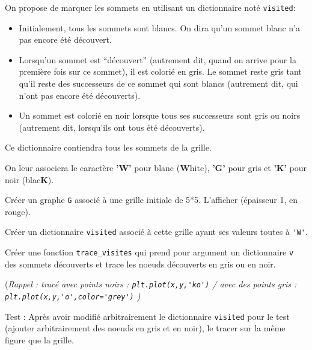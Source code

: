 On propose de marquer les sommets en utilisant un dictionnaire noté \lstinline{visited}:
\begin{itemize}
\item
 Initialement, tous les sommets sont blancs. On dira qu’un sommet blanc n’a pas encore été
découvert.
\item Lorsqu’un sommet est “découvert” (autrement dit, quand on arrive pour la première fois sur
ce sommet), il est colorié en gris. Le sommet reste gris tant qu’il reste des successeurs de ce
sommet qui sont blancs (autrement dit, qui n’ont pas encore été découverts).
\item Un sommet est colorié en noir lorsque tous ses successeurs sont gris ou noirs (autrement dit,
lorsqu’ils ont tous été découverts).

\end{itemize}


Ce dictionnaire contiendra tous les sommets de la grille.

On leur associera le caractère \textbf{'W'} pour blanc (\textbf{W}hite), \textbf{'G'} pour gris et \textbf{'K'} pour noir (blac\textbf{K}).

\begin{question}
Créer un graphe \lstinline{G} associé à une grille initiale de 5*5. L'afficher (épaisseur 1, en rouge).%
\end{question}

\begin{question}
Créer un dictionnaire \lstinline{visited} associé à cette grille ayant ses valeurs toutes à \lstinline{'W'}.
\end{question}

\begin{question}
Créer une fonction \lstinline{trace_visites} qui prend pour argument un dictionnaire \lstinline{v} des sommets découverts et trace les noeuds découverts en gris ou en noir.

 (\textit{Rappel : tracé avec  points noirs : \lstinline{plt.plot(x,y,'ko')}     / avec des points gris : \lstinline{plt.plot(x,y,'o',color='grey')} )}
\end{question}

\begin{question}
Test : Après avoir modifié arbitrairement le dictionnaire \lstinline{visited} pour le test (ajouter arbitrairement des noeuds en gris et en noir), le tracer sur la même figure que la grille.
\end{question}


